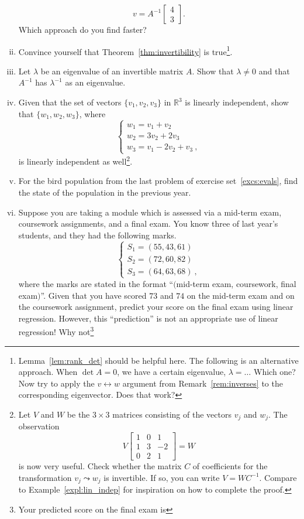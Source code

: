 \begin{exercise}
\begin{enumerate}[(i)]
	\[ v = A^{-1} \begin{bmatrix} 4 \\ 3 \end{bmatrix}. \]
	Which approach do you find faster?
	\item Convince yourself that Theorem~\ref{thm:invertibility} is true\footnote{Lemma~\ref{lem:rank_det} should be helpful here. The following is an alternative approach. When $\det A = 0$, we have a certain eigenvalue, $\lambda = \dots$ Which one? Now try to apply the $v \leftrightarrow w$ argument from Remark~\ref{rem:inverses} to the corresponding eigenvector. Does that work?}.
	\item Let $\lambda$ be an eigenvalue of an invertible matrix $A$. Show that $\lambda\not=0$ and that $A^{-1}$ has $\lambda^{-1}$ as an eigenvalue.
	\item Given that the set of vectors $\{v_1,v_2,v_3\}$ in $\mathbb{R}^3$ is linearly independent, show that $\{w_1,w_2,w_3\}$, where
	\[ \begin{cases} w_1 = v_1 + v_2 \\
	w_2 = 3v_2 + 2v_3 \\ w_3 = v_1 - 2v_2 + v_3	\:, \end{cases} \]
	is linearly independent as well\footnote{Let $V$ and $W$ be the $3 \times 3$ matrices consisting of the vectors $v_j$ and $w_j$. The observation
	\[ V \begin{bmatrix} 1 & 0 & 1 \\ 1 & 3 & -2 \\ 0 & 2 & 1 \end{bmatrix} = W \]
	is now very useful. Check whether the matrix $C$ of coefficients for the transformation $v_j \leadsto w_j$ is invertible. If so, you can write $V=WC^{-1}$. Compare to Example~\ref{expl:lin_indep} for inspiration on how to complete the proof.}.
	\item For the bird population from the last problem of exercise set~\ref{excs:evals}, find the state of the population in the previous year.
		\item Suppose you are taking a module which is assessed via a mid-term exam, coursework assignments, and a final exam. You know three of last year's students, and they had the following marks.
	\[ \begin{cases} S_1 = (55,43,61) \\
	S_2 = (72,60,82) \\
	S_3 = (64,63,68) \:, \end{cases} \]
	where the marks are stated in the format ``$($mid-term exam, coursework, final exam$)$''. Given that you have scored $73$ and $74$ on the mid-term exam and on the coursework assignment, predict your score on the final exam using linear regression. However, this ``prediction'' is not an appropriate use of linear regression! Why not\footnote{Your predicted score on the final exam is
}
\end{enumerate}
\end{exercise}
